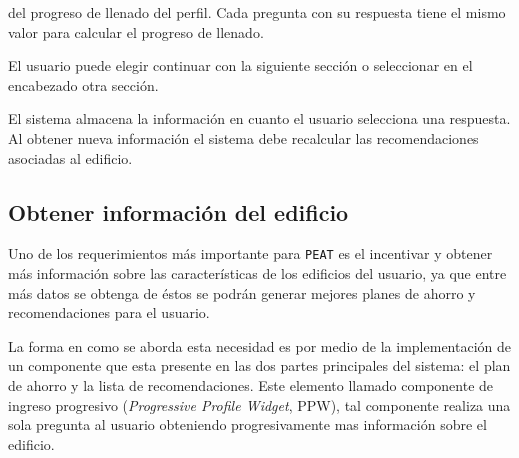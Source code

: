 \begin{usecase}
{\begin{enumerate}
      del progreso de llenado del perfil. Cada pregunta con su respuesta tiene el
      mismo valor para calcular el progreso de llenado.
    \end{enumerate}
  \item El usuario puede elegir continuar con la siguiente sección o seleccionar
    en el encabezado otra sección.
  \item El sistema almacena la información en cuanto el usuario selecciona
    una respuesta. Al obtener nueva información el sistema debe recalcular
    las recomendaciones asociadas al edificio.
  }
\end{usecase}

\subsection{Obtener información del edificio}

Uno de los requerimientos más importante para \texttt{PEAT} es el incentivar y
obtener más información sobre las características de los edificios del usuario,
ya que entre más datos se obtenga de éstos se podrán generar mejores planes
de ahorro y recomendaciones para el usuario.

La forma en como se aborda esta necesidad es por medio de la implementación
de un componente que esta presente en las dos partes principales del sistema:
el plan de ahorro y la lista de recomendaciones. Este elemento llamado
componente de ingreso progresivo (\textit{Progressive Profile Widget}, PPW),
tal componente realiza una sola pregunta al usuario obteniendo progresivamente
mas información sobre el edificio.

